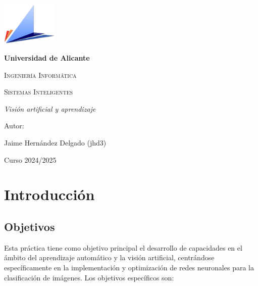 \documentclass[11pt,a4paper]{article}
\begin{document}
	
\begin{titlepage}
	\centering
	\vspace*{\fill}
	\includegraphics[width=0.2\textwidth]{logoeps}
	\vspace{1cm}
	{\bfseries Universidad de Alicante\par}
	\vspace{1cm}
	{\scshape\Large Ingeniería Informática\par}
	\vspace{2cm}
	{\scshape\Huge Sistemas Inteligentes\par}
	\vspace{2cm}
	{\itshape\Large Visión artificial y aprendizaje\par}
	\vspace{\fill}
	{\Large Autor:\par}
	{\Large Jaime Hernández Delgado (jhd3)\par}
	\vspace{\fill}
	{\Large Curso 2024/2025\par}
\end{titlepage}

\newpage

\tableofcontents
\newpage

\section{Introducción}
\subsection{Objetivos}

Esta práctica tiene como objetivo principal el desarrollo de capacidades en el ámbito del aprendizaje automático y la visión artificial, centrándose específicamente en la implementación y optimización de redes neuronales para la clasificación de imágenes. Los objetivos específicos son:
\end{document}
